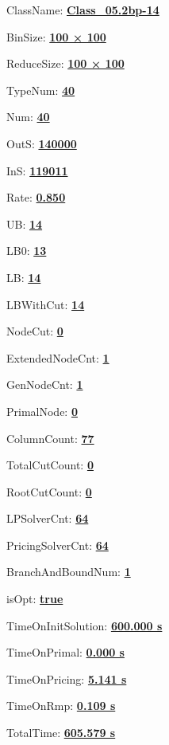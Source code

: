 \documentclass[11pt]{article}
\begin{document}
\pagestyle{empty}


ClassName: \underline{\textbf{Class_05.2bp-14}}
\par
BinSize: \underline{\textbf{100 × 100}}
\par
ReduceSize: \underline{\textbf{100 × 100}}
\par
TypeNum: \underline{\textbf{40}}
\par
Num: \underline{\textbf{40}}
\par
OutS: \underline{\textbf{140000}}
\par
InS: \underline{\textbf{119011}}
\par
Rate: \underline{\textbf{0.850}}
\par
UB: \underline{\textbf{14}}
\par
LB0: \underline{\textbf{13}}
\par
LB: \underline{\textbf{14}}
\par
LBWithCut: \underline{\textbf{14}}
\par
NodeCut: \underline{\textbf{0}}
\par
ExtendedNodeCnt: \underline{\textbf{1}}
\par
GenNodeCnt: \underline{\textbf{1}}
\par
PrimalNode: \underline{\textbf{0}}
\par
ColumnCount: \underline{\textbf{77}}
\par
TotalCutCount: \underline{\textbf{0}}
\par
RootCutCount: \underline{\textbf{0}}
\par
LPSolverCnt: \underline{\textbf{64}}
\par
PricingSolverCnt: \underline{\textbf{64}}
\par
BranchAndBoundNum: \underline{\textbf{1}}
\par
isOpt: \underline{\textbf{true}}
\par
TimeOnInitSolution: \underline{\textbf{600.000 s}}
\par
TimeOnPrimal: \underline{\textbf{0.000 s}}
\par
TimeOnPricing: \underline{\textbf{5.141 s}}
\par
TimeOnRmp: \underline{\textbf{0.109 s}}
\par
TotalTime: \underline{\textbf{605.579 s}}
\par
\newpage


\end{document}
